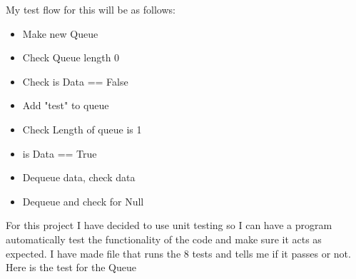 \documentclass[12pt]{article}
\begin{document}
My test flow for this will be as follows:
\begin{itemize}
    \item Make new Queue
    \item Check Queue length 0
    \item Check is Data == False
    \item Add "test" to queue
    \item Check Length of queue is 1
    \item is Data == True
    \item Dequeue data, check data
    \item Dequeue and check for Null
\end{itemize}

For this project I have decided to use unit testing so I can have a program automatically test the functionality of the code and make sure it acts as expected. I have made file that runs the 8 tests and tells me if it passes or not. Here is the test for the Queue
\end{document}
